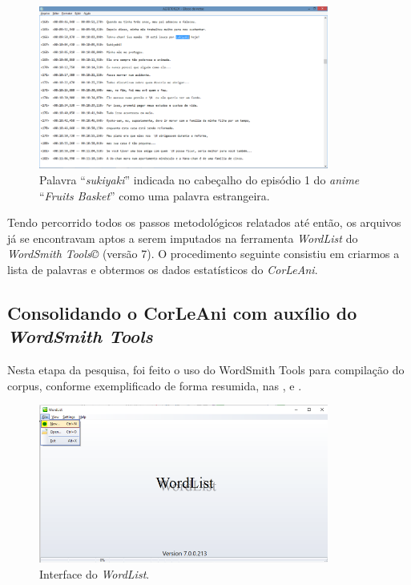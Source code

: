 \documentclass[portuguese]{textolivre}
\begin{document}
\begin{figure}[htbp]
 \centering
 \includegraphics[width=0.85\textwidth]{Fig30.png}
 \caption{Palavra “\textit{sukiyaki}” indicada no cabeçalho do episódio 1 do \textit{anime} “\textit{Fruits Basket}” como uma palavra estrangeira.}
 \label{fig30}
\end{figure}

Tendo percorrido todos os passos metodológicos relatados até então, os arquivos já se encontravam aptos a serem imputados na ferramenta \textit{WordList} do \textit{WordSmith Tools©} (versão 7). O procedimento seguinte consistiu em  criarmos a lista de palavras e obtermos os dados estatísticos do \textit{CorLeAni}.

\subsection{Consolidando o CorLeAni com auxílio do \textit{WordSmith Tools}}

Nesta etapa da pesquisa, foi feito o uso do WordSmith Tools para compilação do corpus, conforme exemplificado de forma resumida, nas ,  e .

\begin{figure}[htbp]
 \centering
 \includegraphics[width=0.85\textwidth]{Fig31.png}
 \caption{Interface do \textit{WordList}.}
 \label{fig31}
\end{figure}
\end{document}
